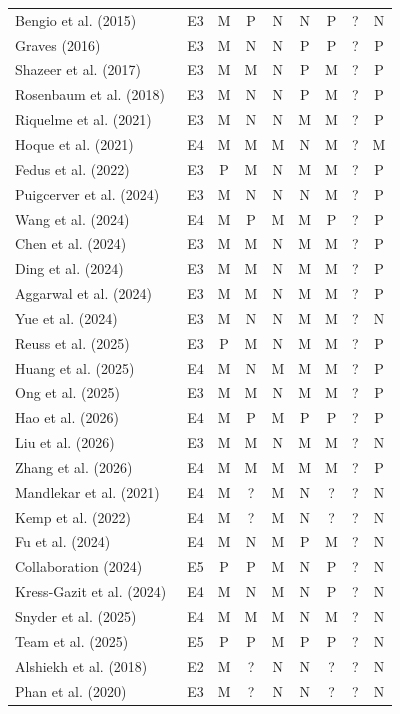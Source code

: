 \documentclass[10pt,a4paper]{article}
\begin{document}
\begin{longtable}{@{}>{\raggedright\arraybackslash}p{5.5cm}cccccccc@{}}
Bengio et al. (2015)~\cite{Bengio2015} & E3 & M & P & N & N & P & ? & N \\
Graves (2016)~\cite{Graves2016} & E3 & M & N & N & P & P & ? & P \\
Shazeer et al. (2017)~\cite{Shazeer2017} & E3 & M & M & N & P & M & ? & P \\
Rosenbaum et al. (2018)~\cite{Rosenbaum2018} & E3 & M & N & N & P & M & ? & P \\
Riquelme et al. (2021)~\cite{Riquelme2021} & E3 & M & N & N & M & M & ? & P \\
Hoque et al. (2021)~\cite{Hoque2021} & E4 & M & M & M & N & M & ? & M \\
Fedus et al. (2022)~\cite{Fedus2022} & E3 & P & M & N & M & M & ? & P \\
Puigcerver et al. (2024)~\cite{Puigcerver2024} & E3 & M & N & N & N & M & ? & P \\
Wang et al. (2024)~\cite{Wang2024b} & E4 & M & P & M & M & P & ? & P \\
Chen et al. (2024)~\cite{Chen2024} & E3 & M & M & N & M & M & ? & P \\
Ding et al. (2024)~\cite{Ding2024} & E3 & M & M & N & M & M & ? & P \\
Aggarwal et al. (2024)~\cite{Aggarwal2024} & E3 & M & M & N & M & M & ? & P \\
Yue et al. (2024)~\cite{Yue2024} & E3 & M & N & N & M & M & ? & N \\
Reuss et al. (2025)~\cite{Reuss2025} & E3 & P & M & N & M & M & ? & P \\
Huang et al. (2025)~\cite{Huang2025} & E4 & M & N & M & M & M & ? & P \\
Ong et al. (2025)~\cite{Ong2025} & E3 & M & M & N & M & M & ? & P \\
Hao et al. (2026)~\cite{SMP2026} & E4 & M & P & M & P & P & ? & P \\
Liu et al. (2026)~\cite{Liu2026} & E3 & M & M & N & M & M & ? & N \\
Zhang et al. (2026)~\cite{Zhang2026b} & E4 & M & M & M & M & M & ? & P \\
Mandlekar et al. (2021)~\cite{Mandlekar2021} & E4 & M & ? & M & N & ? & ? & N \\
Kemp et al. (2022)~\cite{Kemp2022} & E4 & M & ? & M & N & ? & ? & N \\
Fu et al. (2024)~\cite{Fu2024} & E4 & M & N & M & P & M & ? & N \\
Collaboration (2024)~\cite{OXE2024} & E5 & P & P & M & N & P & ? & N \\
Kress-Gazit et al. (2024)~\cite{KressGazit2024} & E4 & M & N & M & N & P & ? & N \\
Snyder et al. (2025)~\cite{Snyder2025} & E4 & M & M & M & N & M & ? & N \\
Team et al. (2025)~\cite{TRI2025} & E5 & P & P & M & P & P & ? & N \\
Alshiekh et al. (2018)~\cite{Alshiekh2018} & E2 & M & ? & N & N & ? & ? & N \\
Phan et al. (2020)~\cite{Phan2020} & E3 & M & ? & N & N & ? & ? & N \\
\bottomrule\end{longtable}
\end{document}
